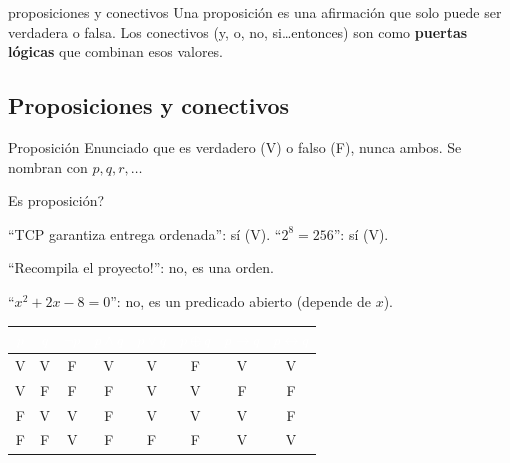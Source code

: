 \begin{tmconcepto}{proposiciones y conectivos}
Una proposici\'on es una afirmaci\'on que solo puede ser verdadera o falsa. Los conectivos (y, o, no, si\ldots entonces) son como \textbf{puertas l\'ogicas} que combinan esos valores.
\end{tmconcepto}


\subsection{Proposiciones y conectivos}
\begin{tmdef}{Proposici\'on}
Enunciado que es verdadero (V) o falso (F), nunca ambos. Se nombran con $p, q, r,\dots$
\end{tmdef}

\begin{tmejemplo}{\textquestiondown Es proposici\'on?}
\begin{tmpasos}
\item ``TCP garantiza entrega ordenada'': s\'i (V). ``$2^8=256$'': s\'i (V).
\item ``\textexclamdown Recompila el proyecto!'': no, es una orden.
\item ``$x^2+2x-8=0$'': no, es un predicado abierto (depende de $x$).
\end{tmpasos}
\end{tmejemplo}

\begin{center}
\renewcommand{\arraystretch}{1.1}
\begin{tabular}{|c|c||c|c|c|c|c|c|}
\hline
\rowcolor{tmAzul}\textcolor{white}{$p$} & \textcolor{white}{$q$} & \textcolor{white}{$\neg p$} & \textcolor{white}{$p\wedge q$} & \textcolor{white}{$p\vee q$} & \textcolor{white}{$p\oplus q$} & \textcolor{white}{$p\to q$} & \textcolor{white}{$p\leftrightarrow q$}\\ \hline
V&V&F&V&V&F&V&V\\ \hline
\rowcolor{tmAzulClaro}V&F&F&F&V&V&F&F\\ \hline
F&V&V&F&V&V&V&F\\ \hline
\rowcolor{tmAzulClaro}F&F&V&F&F&F&V&V\\ \hline
\end{tabular}
\end{center}

